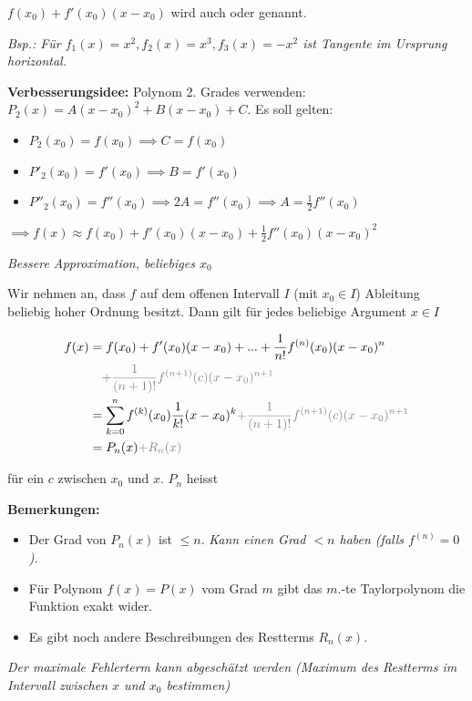 $f(x_0)+f'(x_0)(x-x_0)$ wird auch  oder  genannt.

\textit{Bsp.: Für $f_1(x)=x^2, f_2(x)=x^3, f_3(x)=-x^2$ ist Tangente im Ursprung horizontal.}

\textbf{Verbesserungsidee:} Polynom 2. Grades verwenden: $P_2(x)=A(x-x_0)^2 + B(x-x_0)+C$.
Es soll gelten: 
\begin{itemize}
    \item $P_2(x_0)=f(x_0) \implies C=f(x_0)$
    \item $P'_2(x_0)=f'(x_0) \implies B=f'(x_0)$
    \item $P''_2(x_0)=f''(x_0)\implies 2A=f''(x_0)\implies A=\frac{1}{2}f''(x_0)$
\end{itemize}


$\implies f(x) \approx f(x_0)+f'(x_0)(x-x_0)+\frac{1}{2}f''(x_0)(x-x_0)^2$

\textit{Bessere Approximation, beliebiges $x_0$}

Wir nehmen an, dass $f$ auf dem offenen Intervall $I$ (mit $x_0 \in I$) Ableitung beliebig hoher Ordnung besitzt. Dann gilt für jedes beliebige Argument $x\in I$

\begin{align*}
    f(x)&=f(x_0)+f'(x_0)(x-x_0)+...+\frac{1}{n!}f^{(n)}(x_0)(x-x_0)^n \\
    &\quad{\color{gray}  +\frac{1}{(n+1)!}f^{(n+1)}(c)(x-x_0)^{n+1}} \\
    &=\sum_{k=0}^{n}f^{(k)}(x_0)\frac{1}{k!}(x-x_0)^k {\color{gray}  + \frac{1}{(n+1)!}f^{(n+1)}(c)(x-x_0)^{n+1} } \\
    &=P_n(x){\color{gray} +R_n(x) }
\end{align*}

für ein $c$ zwischen $x_0$ und $x$.
$P_n$ heisst 

\textbf{Bemerkungen:}
\begin{itemize}
    \item Der Grad von $P_n(x)$ ist $\leq n$. \textit{Kann einen Grad $<n$ haben (falls $f^{(n)}=0$).}
    \item Für Polynom $f(x)=P(x)$ vom Grad $m$ gibt das $m$.-te Taylorpolynom die Funktion exakt wider.
    \item Es gibt noch andere Beschreibungen des Restterms $R_n(x)$.
\end{itemize}

\textit{Der maximale Fehlerterm kann abgeschätzt werden (Maximum des Restterms im Intervall zwischen $x$ und $x_0$ bestimmen)}

